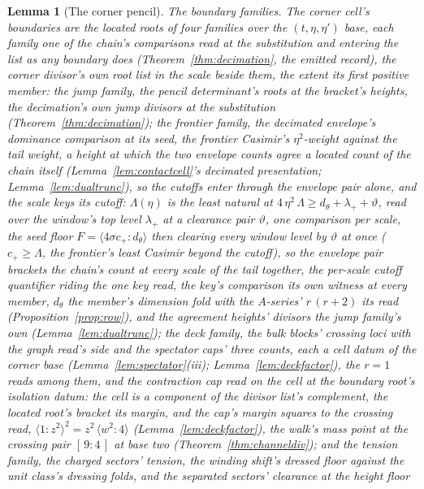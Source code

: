 \documentclass[11pt]{article}
\newtheorem{lemma}{Lemma}
\theoremstyle{definition}
\begin{document}
\begin{lemma}[The corner pencil]
\emph{The boundary families.} The corner cell's boundaries are the
located roots of four families over the $(t,\eta,\eta')$ base, each
family one of the chain's comparisons read at the substitution and
entering the list as any boundary does (Theorem~\ref{thm:decimation}, the
emitted record), the corner divisor's own root list in the scale
beside them, the extent its first positive member: the \emph{jump
family}, the pencil determinant's roots at the bracket's heights,
the decimation's own jump divisors at the substitution
(Theorem~\ref{thm:decimation}); the \emph{frontier family}, the
decimated envelope's dominance comparison at its seed, the frontier
Casimir's $\eta^2$-weight against the tail weight, a height at
which the two envelope counts agree a located count of the chain
itself (Lemma~\ref{lem:contactcell}'s decimated presentation;
Lemma~\ref{lem:dualtrunc}), so the cutoffs enter through the
envelope pair alone, and the scale keys its cutoff: $\Lambda(\eta)$
is the least natural at
$4\,\eta^{2}\,\Lambda\ge d_\theta+\lambda_{+}+\vartheta$, read over
the window's top level $\lambda_{+}$ at a clearance pair
$\vartheta$, one comparison per scale, the seed floor
$F=\langle 4\sigma c_{+}\!:\!d_\theta\rangle$ then clearing every
window level by
$\vartheta$ at once ($c_{+}\ge\Lambda$, the frontier's least Casimir
beyond the cutoff), so the envelope pair brackets the chain's count
at every scale of the tail together, the per-scale cutoff quantifier
riding the one key read, the key's comparison its own witness at
every member, $d_\theta$ the member's dimension fold with the
$A$-series' $r\,(r+2)$ its read (Proposition~\ref{prop:row}), and the
agreement heights' divisors the jump family's own
(Lemma~\ref{lem:dualtrunc}); the \emph{deck family}, the bulk blocks'
crossing loci with the graph read's side and the spectator caps'
three counts, each a cell datum of the corner base
(Lemma~\ref{lem:spectator}(iii); Lemma~\ref{lem:deckfactor}), the
$r=1$ reads among them, and the contraction cap read on the cell
at the boundary root's isolation datum: the cell is a component of
the divisor list's complement, the located root's bracket its
margin, and the cap's margin squares to the crossing read,
$\langle1\!:\!z^2\rangle^2=z^2\,\langle w^2\!:\!4\rangle$
(Lemma~\ref{lem:deckfactor}), the walk's mass point at the
crossing pair $[\,9:4\,]$ at base two
(Theorem~\ref{thm:channeldiv}); and the \emph{tension family}, the charged
sectors' tension, the winding shift's dressed floor against the
unit class's dressing folds, and the separated sectors' clearance
at the height floor

\end{lemma}
\end{document}
